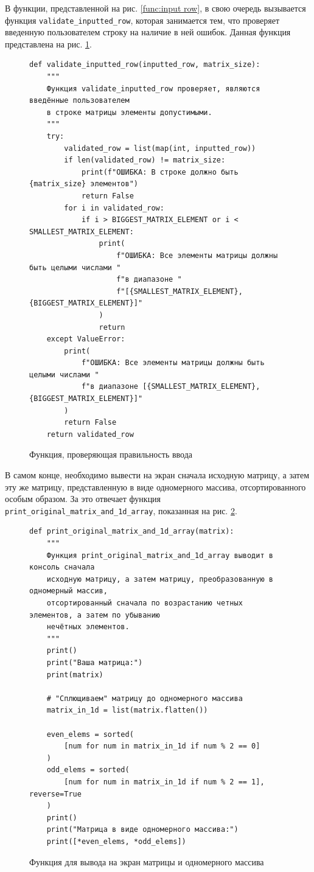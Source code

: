 \documentclass{mirea}
\begin{document}
В функции, представленной на рис. \ref{func:input row}, в свою очередь вызывается функция \texttt{validate\_inputted\_row}, которая занимается тем, что проверяет введенную пользователем строку на наличие в ней ошибок. Данная функция представлена на рис. \ref{func:validate}.
\begin{figure}[ht]
	\begin{verbatim}
def validate_inputted_row(inputted_row, matrix_size):
    """
    Функция validate_inputted_row проверяет, являются введённые пользователем
    в строке матрицы элементы допустимыми.
    """
    try:
        validated_row = list(map(int, inputted_row))
        if len(validated_row) != matrix_size:
            print(f"ОШИБКА: В строке должно быть {matrix_size} элементов")
            return False
        for i in validated_row:
            if i > BIGGEST_MATRIX_ELEMENT or i < SMALLEST_MATRIX_ELEMENT:
                print(
                    f"ОШИБКА: Все элементы матрицы должны быть целыми числами "
                    f"в диапазоне "
                    f"[{SMALLEST_MATRIX_ELEMENT}, {BIGGEST_MATRIX_ELEMENT}]"
                )
                return
    except ValueError:
        print(
            f"ОШИБКА: Все элементы матрицы должны быть целыми числами "
            f"в диапазоне [{SMALLEST_MATRIX_ELEMENT}, {BIGGEST_MATRIX_ELEMENT}]"
        )
        return False
    return validated_row	
	\end{verbatim}
	\caption{Функция, проверяющая правильность ввода}
	\label{func:validate}
\end{figure}


В самом конце, необходимо вывести на экран сначала исходную матрицу, а затем эту же матрицу, представленную в виде одномерного массива, отсортированного особым образом. За это отвечает функция \texttt{print\_original\_matrix\_and\_1d\_array}, показанная на рис. \ref{func:print array}.
\begin{figure}[ht]
	\begin{verbatim}
def print_original_matrix_and_1d_array(matrix):
    """
    Функция print_original_matrix_and_1d_array выводит в консоль сначала
    исходную матрицу, а затем матрицу, преобразованную в одномерный массив,
    отсортированный сначала по возрастанию четных элементов, а затем по убыванию
    нечётных элементов.
    """
    print()
    print("Ваша матрица:")
    print(matrix)

    # "Сплющиваем" матрицу до одномерного массива
    matrix_in_1d = list(matrix.flatten())

    even_elems = sorted(
        [num for num in matrix_in_1d if num % 2 == 0]
    )
    odd_elems = sorted(
        [num for num in matrix_in_1d if num % 2 == 1], reverse=True
    )
    print()
    print("Матрица в виде одномерного массива:")
    print([*even_elems, *odd_elems])	
	\end{verbatim}
	\caption{Функция для вывода на экран матрицы и одномерного массива}
	\label{func:print array}
\end{figure}
\end{document}

